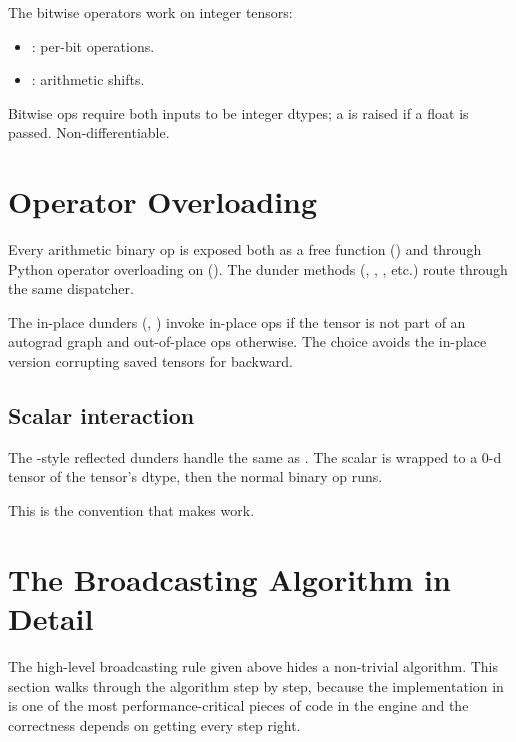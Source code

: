 The bitwise operators work on integer tensors:

\begin{itemize}
  \item {}: per-bit
    operations.
  \item {}: arithmetic shifts.
\end{itemize}

Bitwise ops require both inputs to be integer dtypes; a
 is raised if a float is passed. Non-differentiable.

\section{Operator Overloading}
\label{sec:binary_functions:overload}

Every arithmetic binary op is exposed both as a free function
() and through Python operator overloading
on  (). The dunder methods
(, , , etc.)
route through the same dispatcher.

The in-place dunders (, )
invoke in-place ops if the tensor is not part of an autograd graph
and out-of-place ops otherwise. The choice avoids the in-place
version corrupting saved tensors for backward.

\subsection{Scalar interaction}
\label{ssec:binary_functions:scalar_interact}

The -style reflected dunders handle
 the same as . The
scalar is wrapped to a 0-d tensor of the tensor's dtype, then the
normal binary op runs.

This is the convention that makes  work.

\section{The Broadcasting Algorithm in Detail}
\label{sec:binary_functions:broadcast_algo}

The high-level broadcasting rule given above hides a non-trivial
algorithm. This section walks through the algorithm step by step,
because the implementation in
 is one of the most
performance-critical pieces of code in the engine and the
correctness depends on getting every step right.

